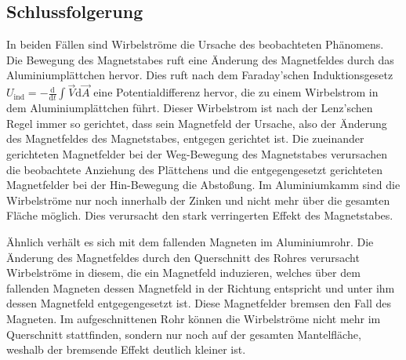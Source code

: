 \documentclass[
	a4paper,
	12pt,
	pagesize,
	ngerman
]{scrartcl}
\begin{document}
	\subsection{Schlussfolgerung}
	In beiden Fällen sind Wirbelströme die Ursache des beobachteten Phänomens.
	Die Bewegung des Magnetstabes ruft eine Änderung des Magnetfeldes durch das Aluminiumplättchen hervor. Dies ruft nach dem Faraday'schen Induktionsgesetz $U_\text{ind}= - \frac{\text{d}}{\text{d}t} \int \vec{V} \text{d} \vec{A}$ eine Potentialdifferenz hervor, die zu einem Wirbelstrom in dem Aluminiumplättchen führt. Dieser Wirbelstrom ist nach der Lenz'schen Regel immer so gerichtet, dass sein Magnetfeld der Ursache, also der Änderung des Magnetfeldes des Magnetstabes, entgegen gerichtet ist.%
	Die zueinander gerichteten Magnetfelder bei der Weg-Bewegung des Magnetstabes verursachen die beobachtete Anziehung des Plättchens und die entgegengesetzt gerichteten Magnetfelder bei der Hin-Bewegung die Abstoßung.
	Im Aluminiumkamm sind die Wirbelströme nur noch innerhalb der Zinken und nicht mehr über die gesamten Fläche möglich. Dies verursacht den stark verringerten Effekt des Magnetstabes. \par
	Ähnlich verhält es sich mit dem fallenden Magneten im Aluminiumrohr. Die Änderung des Magnetfeldes durch den Querschnitt des Rohres verursacht Wirbelströme in diesem, die ein Magnetfeld induzieren, welches über dem fallenden Magneten dessen Magnetfeld in der Richtung entspricht und unter ihm dessen Magnetfeld entgegengesetzt ist. Diese Magnetfelder bremsen den Fall des Magneten. Im aufgeschnittenen Rohr können die Wirbelströme nicht mehr im Querschnitt stattfinden, sondern nur noch auf der gesamten Mantelfläche, weshalb der bremsende Effekt deutlich kleiner ist. %
\end{document}
